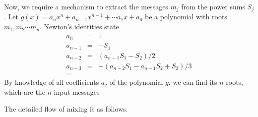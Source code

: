\documentclass[a4paper,10pt,twocolumn]{article}
\begin{document}
 Now, we require a mechanism to extract the messages \( m_j\) from  the  power  sums \(S_j\).
 Let \( g(x) = a_{n}x^{n}+a_{n-1}x^{n-1}+ \cdots a_1x+a_0 \) 
 be  a  polynomial  with  roots \(m_1,m_2 \cdots m_n\). Newton’s identities  state 
 \begin{eqnarray*}
	a_n&=& 1 \\
	a_{n-1}&=&-S_1 \\
	a_{n-2}&=& (a_{n-1}S_1-S_2)/2 \\
	a_{n-3}&=& -(a_{n-2}S_{1}-a_{n-1}S_2+S_3)/3 \\
	\cdots&
 \end{eqnarray*}
	By knowledge of all coefficients \( a_j\) of the polynomial \(g\), we can find its \(n\) roots, which are the \(n\) input messages

	\vspace{2.5mm}

	The detailed flow of mixing is as follows.
\end{document}
